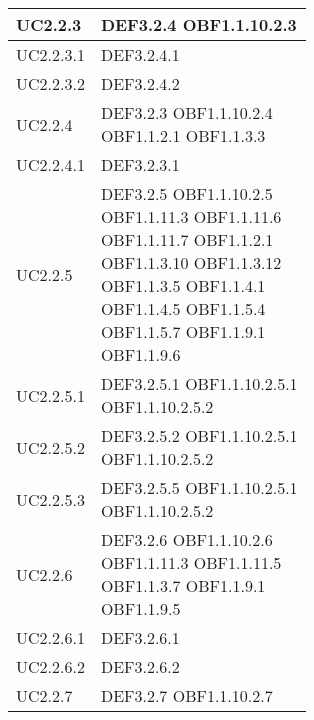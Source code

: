 \documentclass{scalatekids-article}
\begin{document}
\begin{longtable}[H]{|p{5.5cm}|p{5.5cm}|}
  \hline
  UC2.2.3 & \multiLineCell[t]{DEF3.2.4 OBF1.1.10.2.3\\}\\
  \hline
  UC2.2.3.1 & \multiLineCell[t]{DEF3.2.4.1\\}\\
  \hline
  UC2.2.3.2 & \multiLineCell[t]{DEF3.2.4.2\\}\\
  \hline
  UC2.2.4 & \multiLineCell[t]{DEF3.2.3 OBF1.1.10.2.4\\OBF1.1.2.1 OBF1.1.3.3\\}\\
  \hline
  UC2.2.4.1 & \multiLineCell[t]{DEF3.2.3.1\\}\\
  \hline
  UC2.2.5 & \multiLineCell[t]{DEF3.2.5 OBF1.1.10.2.5\\OBF1.1.11.3 OBF1.1.11.6\\OBF1.1.11.7 OBF1.1.2.1\\OBF1.1.3.10 OBF1.1.3.12\\OBF1.1.3.5 OBF1.1.4.1\\OBF1.1.4.5 OBF1.1.5.4\\OBF1.1.5.7 OBF1.1.9.1\\OBF1.1.9.6\\}\\
  \hline
  UC2.2.5.1 & \multiLineCell[t]{DEF3.2.5.1 OBF1.1.10.2.5.1\\OBF1.1.10.2.5.2\\}\\
  \hline
  UC2.2.5.2 & \multiLineCell[t]{DEF3.2.5.2 OBF1.1.10.2.5.1\\OBF1.1.10.2.5.2\\}\\
  \hline
  UC2.2.5.3 & \multiLineCell[t]{DEF3.2.5.5 OBF1.1.10.2.5.1\\OBF1.1.10.2.5.2\\}\\
  \hline
  UC2.2.6 & \multiLineCell[t]{DEF3.2.6 OBF1.1.10.2.6\\OBF1.1.11.3 OBF1.1.11.5\\OBF1.1.3.7 OBF1.1.9.1\\OBF1.1.9.5\\}\\
  \hline
  UC2.2.6.1 & \multiLineCell[t]{DEF3.2.6.1\\}\\
  \hline
  UC2.2.6.2 & \multiLineCell[t]{DEF3.2.6.2\\}\\
  \hline
  UC2.2.7 & \multiLineCell[t]{DEF3.2.7 OBF1.1.10.2.7\\}\\

\end{longtable}
\end{document}
